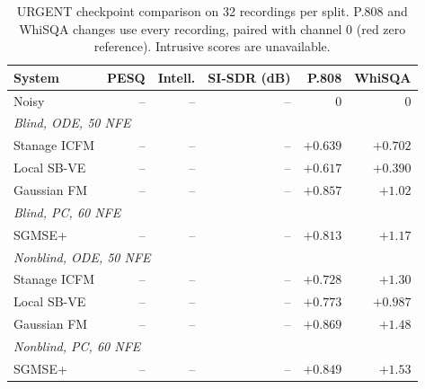\begin{table}[htbp]\centering\small
\setlength{\tabcolsep}{4pt}
\begin{tabular}{lrrrrr}\toprule
System & PESQ & Intell. & SI-SDR (dB) & P.808 & WhiSQA \\ \midrule
\rowcolor{worstred}Noisy & -- & -- & -- & 0 & 0 \\
\midrule\multicolumn{6}{l}{\itshape Blind, ODE, 50 NFE} \\
Stanage ICFM & -- & -- & -- & \cellcolor{secondorange}$+0.639$ & \cellcolor{secondorange}$+0.702$ \\
Local SB-VE & -- & -- & -- & \cellcolor{worstred}$+0.617$ & \cellcolor{worstred}$+0.390$ \\
Gaussian FM & -- & -- & -- & \cellcolor{bestblue}$+0.857$ & \cellcolor{bestblue}$+1.02$ \\
\midrule\multicolumn{6}{l}{\itshape Blind, PC, 60 NFE} \\
SGMSE+ & -- & -- & -- & $+0.813$ & $+1.17$ \\
\midrule\multicolumn{6}{l}{\itshape Nonblind, ODE, 50 NFE} \\
Stanage ICFM & -- & -- & -- & \cellcolor{worstred}$+0.728$ & \cellcolor{secondorange}$+1.30$ \\
Local SB-VE & -- & -- & -- & \cellcolor{secondorange}$+0.773$ & \cellcolor{worstred}$+0.987$ \\
Gaussian FM & -- & -- & -- & \cellcolor{bestblue}$+0.869$ & \cellcolor{bestblue}$+1.48$ \\
\midrule\multicolumn{6}{l}{\itshape Nonblind, PC, 60 NFE} \\
SGMSE+ & -- & -- & -- & $+0.849$ & $+1.53$ \\
\bottomrule\end{tabular}
\caption{URGENT checkpoint comparison on 32 recordings per split. P.808 and WhiSQA changes use every recording, paired with channel 0 (red zero reference). Intrusive scores are unavailable.}\label{tab:cfmse-urgent-subset}
\end{table}
